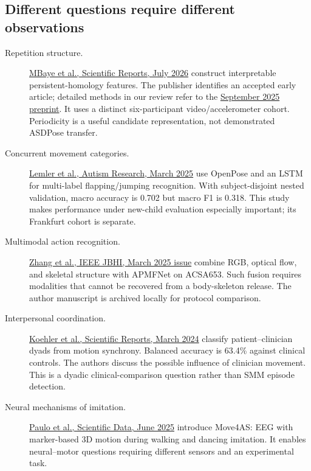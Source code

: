 \subsection{Different questions require different observations}
\begin{description}
\item[Repetition structure.]
\href{https://doi.org/10.1038/s41598-026-60095-8}{MBaye et al., Scientific Reports,
July 2026} construct interpretable persistent-homology features. The publisher
identifies an accepted early article; detailed methods in our review refer to
the \href{https://doi.org/10.1101/2025.09.03.674008}{September 2025 preprint}.
It uses a distinct six-participant video/accelerometer cohort. Periodicity is
a useful candidate representation, not demonstrated ASDPose transfer.

\item[Concurrent movement categories.]
\href{https://doi.org/10.1002/aur.70020}{Lemler et al., Autism Research, March 2025}
use OpenPose and an LSTM for multi-label flapping/jumping recognition. With
subject-disjoint nested validation, macro accuracy is 0.702 but macro F1 is
0.318. This study makes performance under new-child evaluation especially
important; its Frankfurt cohort is separate.

\item[Multimodal action recognition.]
\href{https://doi.org/10.1109/JBHI.2024.3511601}{Zhang et al., IEEE JBHI,
March 2025 issue} combine RGB, optical flow, and skeletal structure with APMFNet
on ACSA653. Such fusion requires modalities that cannot be recovered from a
body-skeleton release. The author manuscript is archived locally for protocol
comparison.

\item[Interpersonal coordination.]
\href{https://doi.org/10.1038/s41598-024-56098-y}{Koehler et al., Scientific
Reports, March 2024} classify patient--clinician dyads from motion synchrony.
Balanced accuracy is 63.4\% against clinical controls. The authors discuss the
possible influence of clinician movement. This is a dyadic clinical-comparison
question rather than SMM episode detection.

\item[Neural mechanisms of imitation.]
\href{https://doi.org/10.1038/s41597-025-05313-0}{Paulo et al., Scientific Data,
June 2025} introduce Move4AS: EEG with marker-based 3D motion during walking
and dancing imitation. It enables neural--motor questions requiring different
sensors and an experimental task.


\end{description}
